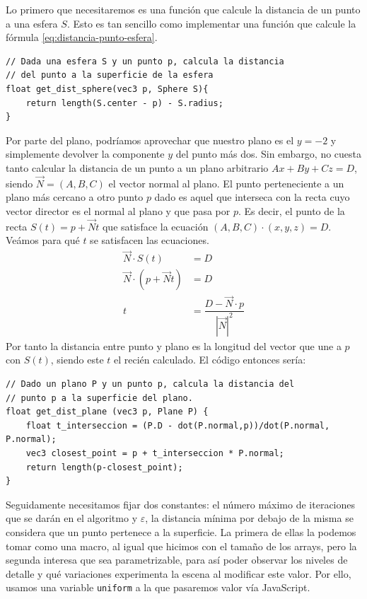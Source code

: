 Lo primero que necesitaremos es una función que calcule la distancia de un punto a una esfera $S$. Esto es tan sencillo como implementar una función que calcule la fórmula \ref{eq:distancia-punto-esfera}.

\begin{lstlisting}
// Dada una esfera S y un punto p, calcula la distancia
// del punto a la superficie de la esfera
float get_dist_sphere(vec3 p, Sphere S){
    return length(S.center - p) - S.radius;
}
\end{lstlisting}

Por parte del plano, podríamos aprovechar que nuestro plano es el $y=-2$ y simplemente devolver la componente $y$ del punto más dos. Sin embargo, no cuesta tanto calcular la distancia de un punto a un plano arbitrario $Ax+By+Cz = D$, siendo $\vec N=(A,B,C)$ el vector normal al plano. El punto perteneciente a un plano más cercano a otro punto $p$ dado es aquel que interseca con la recta cuyo vector director es el normal al plano y que pasa por $p$. Es decir, el punto de la recta $S(t)=p+\vec Nt$ que satisface la ecuación $(A,B,C)\cdot (x,y,z) = D$. Veámos para qué $t$ se satisfacen las ecuaciones.
\begin{equation}
    \begin{split}
        \vec N\cdot S(t) &= D \\
        \vec N\cdot (p+\vec N t) &= D \\
        t &= \dfrac{D-\vec N \cdot p}{|\vec N|^2}
    \end{split}
\end{equation}
Por tanto la distancia entre punto y plano es la longitud del vector que une a $p$ con $S(t)$, siendo este $t$ el recién calculado. El código entonces sería:
\begin{lstlisting}
// Dado un plano P y un punto p, calcula la distancia del 
// punto p a la superficie del plano.
float get_dist_plane (vec3 p, Plane P) {
    float t_interseccion = (P.D - dot(P.normal,p))/dot(P.normal, P.normal);
    vec3 closest_point = p + t_interseccion * P.normal;
    return length(p-closest_point);
}
\end{lstlisting}

Seguidamente necesitamos fijar dos constantes: el número máximo de iteraciones que se darán en el algoritmo y $\varepsilon$, la distancia mínima por debajo de la misma se considera que un punto pertenece a la superficie. La primera de ellas la podemos tomar como una macro, al igual que hicimos con el tamaño de los arrays, pero la segunda interesa que sea parametrizable, para así poder observar los niveles de detalle y qué variaciones experimenta la escena al modificar este valor. Por ello, usamos una variable \verb|uniform| a la que pasaremos valor vía JavaScript.


